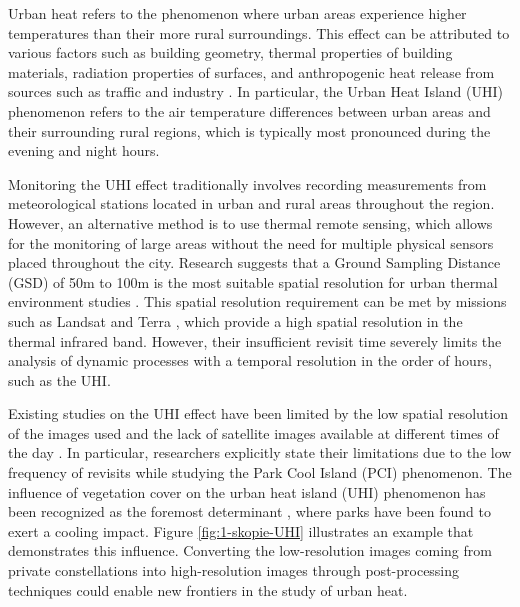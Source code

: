     Urban heat refers to the phenomenon where urban areas experience higher temperatures than their more rural surroundings.
    This effect can be attributed to various factors such as building geometry, thermal properties of building materials, radiation properties of surfaces, and anthropogenic heat release from sources such as traffic and industry \cite{deilami2018urban}. 
    In particular,  the Urban Heat Island (UHI) phenomenon refers to the air temperature differences between urban areas and their surrounding rural regions, which is typically most pronounced during the evening and night hours. 

    Monitoring the UHI effect traditionally involves recording measurements from meteorological stations located in urban and rural areas throughout the region.
    However, an alternative method is to use thermal remote sensing, which allows for the monitoring of large areas without the need for multiple physical sensors placed throughout the city.
    Research suggests that a Ground Sampling Distance (GSD) of 50m to 100m is the most suitable spatial resolution for urban thermal environment studies \cite{mohamed2017land, sobrino2012impact, huang2013generating}. 
    This spatial resolution requirement can be met by missions such as Landsat \cite{USGS2023Landsat} and Terra \cite{terra_nasa}, which provide a high spatial resolution in the thermal infrared band.
    However, their insufficient revisit time severely limits the analysis of dynamic processes with a temporal resolution in the order of hours, such as the UHI. 

    Existing studies on the UHI effect have been limited by the low spatial resolution of the images used and the lack of satellite images available at different times of the day \cite{Zhu2021, Shi2019}. 
    In particular, researchers explicitly state their limitations \cite{Shi2019} due to the low frequency of revisits while studying the Park Cool Island (PCI) \cite{Yang2017} phenomenon. 
    The influence of vegetation cover on the urban heat island (UHI) phenomenon has been recognized as the foremost determinant \cite{deilami2018urban}, where parks have been found to exert a cooling impact.
    Figure \ref{fig:1-skopie-UHI} illustrates an example that demonstrates this influence. 
    Converting the low-resolution images coming from private constellations into high-resolution images through post-processing techniques could enable new frontiers in the study of urban heat. 

